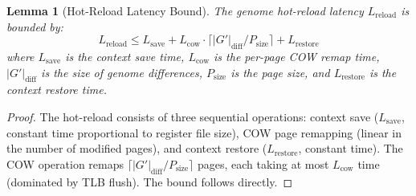 \documentclass{article}
\newtheorem{lemma}[theorem]{Lemma}
\begin{document}
\begin{lemma}[Hot-Reload Latency Bound]
The genome hot-reload latency $L_{\text{reload}}$ is bounded by:
$$L_{\text{reload}} \leq L_{\text{save}} + L_{\text{cow}} \cdot \lceil |G'|_{\text{diff}} / P_{\text{size}} \rceil + L_{\text{restore}}$$
where $L_{\text{save}}$ is the context save time, $L_{\text{cow}}$ is the per-page COW remap time, $|G'|_{\text{diff}}$ is the size of genome differences, $P_{\text{size}}$ is the page size, and $L_{\text{restore}}$ is the context restore time.
\end{lemma}

\begin{proof}
The hot-reload consists of three sequential operations: context save ($L_{\text{save}}$, constant time proportional to register file size), COW page remapping (linear in the number of modified pages), and context restore ($L_{\text{restore}}$, constant time). The COW operation remaps $\lceil |G'|_{\text{diff}} / P_{\text{size}} \rceil$ pages, each taking at most $L_{\text{cow}}$ time (dominated by TLB flush). The bound follows directly.
\end{proof}
\end{document}
